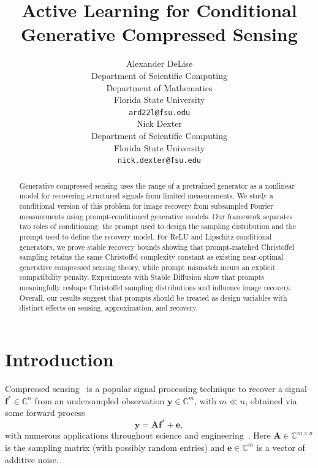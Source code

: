 \documentclass{article}
\title{Active Learning for Conditional Generative Compressed Sensing}
\author{%
  Alexander DeLise \\ %
  Department of Scientific Computing \\
  Department of Mathematics \\
  Florida State University \\
  \texttt{ard22l@fsu.edu} \\
  \And
  Nick Dexter \\
  Department of Scientific Computing \\
  Florida State University \\
  \texttt{nick.dexter@fsu.edu}
}
\theoremstyle{plain}
\theoremstyle{definition}
\theoremstyle{remark}
\begin{document}
\maketitle

\begin{abstract}
Generative compressed sensing uses the range of a pretrained generator as a nonlinear model for recovering structured signals from limited measurements. We study a conditional version of this problem for image recovery from subsampled Fourier measurements using prompt-conditioned generative models. Our framework separates two roles of conditioning: the prompt used to design the sampling distribution and the prompt used to define the recovery model. For ReLU and Lipschitz conditional generators, we prove stable recovery bounds showing that prompt-matched Christoffel sampling retains the same Christoffel complexity constant as existing near-optimal generative compressed sensing theory, while prompt mismatch incurs an explicit compatibility penalty. Experiments with Stable Diffusion show that prompts meaningfully reshape Christoffel sampling distributions and influence image recovery. Overall, our results suggest that prompts should be treated as design variables with distinct effects on sensing, approximation, and recovery.
\end{abstract}



\section{Introduction}
Compressed sensing~\cite{donoho2006compressed} is a popular signal processing technique to recover a signal $\mathbf{f}^* \in \mathbb{C}^n$ from an undersampled observation $\mathbf{y} \in \mathbb{C}^m$, with $m \ll n$, obtained via some forward process
\begin{equation}
    \mathbf{y} = \mathbf{A} \mathbf{f}^* + \mathbf{e}, \label{eq:CS}
\end{equation}
with numerous applications throughout science and engineering~\cite{chen2008prior,lustig2007sparse,duarte2008single,yuan2021snapshot,herrmann2012fighting}.
Here $\mathbf{A} \in \mathbb{C}^{m \times n}$ is the sampling matrix (with possibly random entries) and $\mathbf{e} \in \mathbb{C}^m$ is a vector of additive noise. 
\end{document}
